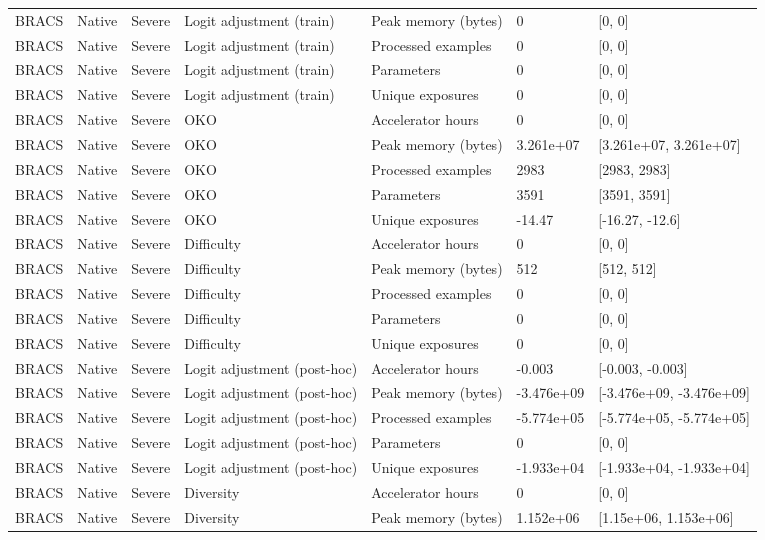 \begin{longtable}{lllllll}
BRACS & Native & Severe & Logit adjustment (train) & Peak memory (bytes) & 0 & [0, 0] \\
BRACS & Native & Severe & Logit adjustment (train) & Processed examples & 0 & [0, 0] \\
BRACS & Native & Severe & Logit adjustment (train) & Parameters & 0 & [0, 0] \\
BRACS & Native & Severe & Logit adjustment (train) & Unique exposures & 0 & [0, 0] \\
BRACS & Native & Severe & OKO & Accelerator hours & 0 & [0, 0] \\
BRACS & Native & Severe & OKO & Peak memory (bytes) & 3.261e+07 & [3.261e+07, 3.261e+07] \\
BRACS & Native & Severe & OKO & Processed examples & 2983 & [2983, 2983] \\
BRACS & Native & Severe & OKO & Parameters & 3591 & [3591, 3591] \\
BRACS & Native & Severe & OKO & Unique exposures & -14.47 & [-16.27, -12.6] \\
BRACS & Native & Severe & Difficulty & Accelerator hours & 0 & [0, 0] \\
BRACS & Native & Severe & Difficulty & Peak memory (bytes) & 512 & [512, 512] \\
BRACS & Native & Severe & Difficulty & Processed examples & 0 & [0, 0] \\
BRACS & Native & Severe & Difficulty & Parameters & 0 & [0, 0] \\
BRACS & Native & Severe & Difficulty & Unique exposures & 0 & [0, 0] \\
BRACS & Native & Severe & Logit adjustment (post-hoc) & Accelerator hours & -0.003 & [-0.003, -0.003] \\
BRACS & Native & Severe & Logit adjustment (post-hoc) & Peak memory (bytes) & -3.476e+09 & [-3.476e+09, -3.476e+09] \\
BRACS & Native & Severe & Logit adjustment (post-hoc) & Processed examples & -5.774e+05 & [-5.774e+05, -5.774e+05] \\
BRACS & Native & Severe & Logit adjustment (post-hoc) & Parameters & 0 & [0, 0] \\
BRACS & Native & Severe & Logit adjustment (post-hoc) & Unique exposures & -1.933e+04 & [-1.933e+04, -1.933e+04] \\
BRACS & Native & Severe & Diversity & Accelerator hours & 0 & [0, 0] \\
BRACS & Native & Severe & Diversity & Peak memory (bytes) & 1.152e+06 & [1.15e+06, 1.153e+06] \\

\end{longtable}

